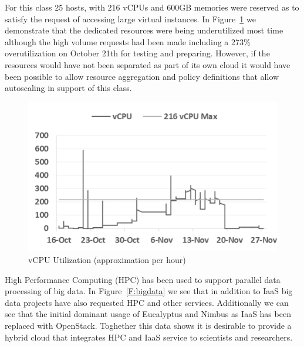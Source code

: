 \documentclass{sig-alternate-05-2015}
\begin{document}
For this class 25 hosts, with 216 vCPUs and 600GB memories were
reserved as to satisfy the request of accessing large virtual
instances. In Figure~\ref{F:fig6} we demonstrate that the dedicated
resources were being underutilized most time although the high volume
requests had been made including a 273\% overutilization on
October 21th for testing and preparing. However, if the resources
would have not been separated as part of its own cloud it would have
been possible to allow resource aggregation and policy definitions
that allow autoscaling in support of this class.
  
\begin{figure}[htb] 
  \centering 
    \includegraphics[width=1.0\columnwidth]{images/fig5.pdf} 
  \caption{vCPU Utilization (approximation per hour)}\label{F:fig6} 
\end{figure} 

High Performance Computing (HPC) has been used to support parallel
data processing of big data. In Figure~\ref{F:bigdata} we see that in
addition to IaaS big data projects have also requested HPC and other
services. Additionally we can see that the initial dominant usage of
Eucalyptus and Nimbus as IaaS has been replaced with OpenStack.
Toghether this data shows it is desirable to provide a hybrid cloud
that integrates HPC and IaaS service to scientists and researchers.
\end{document}
